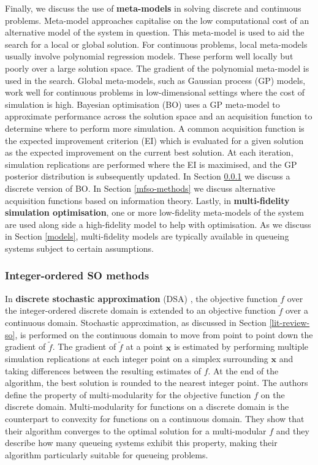 \documentclass[12pt,a4paper]{article}
\begin{document}
Finally, we discuss the use of \textbf{meta-models} in solving discrete and continuous problems. Meta-model approaches capitalise on the low computational cost of an alternative model of the system in question. This meta-model is used to aid the search for a local or global solution. For continuous problems, local meta-models usually involve polynomial regression models. These perform well locally but poorly over a large solution space. The gradient of the polynomial meta-model is used in the search. Global meta-models, such as Gaussian process (GP) models, work well for continuous problems in low-dimensional settings where the cost of simulation is high. Bayesian optimisation (BO) uses a GP meta-model to approximate performance across the solution space and an acquisition function to determine where to perform more simulation. A common acquisition function is the expected improvement criterion (EI) which is evaluated for a given solution as the expected improvement on the current best solution. At each iteration, simulation replications are performed where the EI is maximised, and the GP posterior distribution is subsequently updated. In Section \ref{int-ordered-so} we discuss a discrete version of BO. In Section \ref{mfso-methods} we discuss alternative acquisition functions based on information theory. Lastly, in \textbf{multi-fidelity simulation optimisation}, one or more low-fidelity meta-models of the system are used along side a high-fidelity model to help with optimisation. As we discuss in Section \ref{models}, multi-fidelity models are typically available in queueing systems subject to certain assumptions.

\subsubsection{Integer-ordered SO methods} \label{int-ordered-so}
%
In \textbf{discrete stochastic approximation} (DSA) \citep{lim2012stochastic}, the objective function $f$ over the integer-ordered discrete domain is extended to an objective function $\tilde{f}$ over a continuous domain. Stochastic approximation, as discussed in Section \ref{lit-review-so}, is performed on the continuous domain to move from point to point down the gradient of $\tilde{f}$. The gradient of $\tilde{f}$ at a point $\boldsymbol{x}$ is estimated by performing multiple simulation replications at each integer point on a simplex surrounding $\boldsymbol{x}$ and taking differences between the resulting estimates of $f$. At the end of the algorithm, the best solution is rounded to the nearest integer point. The authors define the property of multi-modularity for the objective function $f$ on the discrete domain. Multi-modularity for functions on a discrete domain is the counterpart to convexity for functions on a continuous domain. They show that their algorithm converges to the optimal solution for a multi-modular $f$ and they describe how many queueing systems exhibit this property, making their algorithm particularly suitable for queueing problems.
\end{document}
